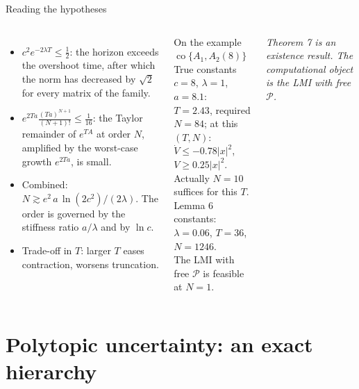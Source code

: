 \documentclass[10pt,aspectratio=169]{beamer}
\newcommand{\PP}{\mathcal{P}}
\DeclareMathOperator{\co}{co}
\begin{document}
\begin{frame}{Reading the hypotheses}
\begin{columns}
\begin{itemize}
\item $c^2e^{-2\lambda T}\le\frac12$: the horizon exceeds the \alert{overshoot time}, after which the norm has decreased by $\sqrt2$ for every matrix of the family.
\item $e^{2Ta}\frac{(Ta)^{N+1}}{(N+1)!}\le\frac1{16}$: the Taylor remainder of $e^{TA}$ at order $N$, amplified by the worst-case growth $e^{2Ta}$, is small.
\item Combined: $N\gtrsim e^2\,a\,\ln(2c^2)/(2\lambda)$. The order is governed by the \alert{stiffness ratio} $a/\lambda$ and by $\ln c$.
\item Trade-off in $T$: larger $T$ eases contraction, worsens truncation.
\end{itemize}
\begin{block}{On the example $\co\{A_1,A_2(8)\}$}
True constants $c=8$, $\lambda=1$, $a=8.1$: \\
$T=2.43$, required $N=84$; at this $(T,N)$: $\dot V\le-0.78|x|^2$, $V\ge0.25|x|^2$.\\
Actually $N=10$ suffices for this $T$.\\
Lemma 6 constants: $\lambda=0.06$, $T=36$, $N=1246$.\\
The LMI with free $\PP$ is feasible at $N=1$.
\end{block}
\medskip
\emph{Theorem 7 is an existence result. The computational object is the LMI with free $\PP$.}
\end{columns}
\end{frame}

\section{Polytopic uncertainty: an exact hierarchy}
\end{document}
